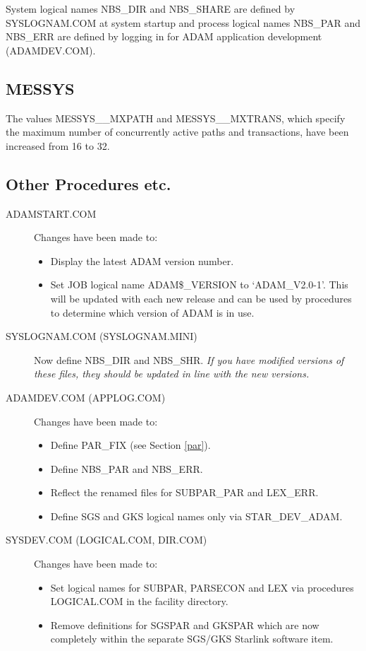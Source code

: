 System logical names NBS\_DIR and NBS\_SHARE are defined by SYSLOGNAM.COM at
system startup and process logical names NBS\_PAR and NBS\_ERR are defined by
logging in for ADAM application development (ADAMDEV.COM).

\subsection{MESSYS}
The values MESSYS\_\_MXPATH and MESSYS\_\_MXTRANS, which specify the maximum
number of concurrently active paths and transactions, have been increased from
16 to 32.

\subsection{Other Procedures etc.}
\begin{description}

\item[ADAMSTART.COM] Changes have been made to:
\begin{itemize}
\item Display the latest ADAM version number.
\item Set JOB logical name ADAM\$\_VERSION to `ADAM\_V2.0-1'.
This will be updated with each new release and can be used by procedures
to determine which version of ADAM is in use.
\end{itemize}
\item[SYSLOGNAM.COM (SYSLOGNAM.MINI)] Now define NBS\_DIR 
and NBS\_SHR. 
{\em If you have modified versions of these files, they should be
updated in line with the new versions.}
\item[ADAMDEV.COM (APPLOG.COM)] Changes have been made to:
\begin{itemize}
\item Define PAR\_FIX (see Section \ref{par}).
\item Define  NBS\_PAR and NBS\_ERR.
\item Reflect the renamed files for SUBPAR\_PAR and LEX\_ERR.
\item Define SGS and GKS logical names only via STAR\_DEV\_ADAM.
\end{itemize}

\item[SYSDEV.COM (LOGICAL.COM, DIR.COM)] Changes have been made to:
\begin{itemize} 
\item Set logical names for SUBPAR, PARSECON and  LEX via procedures
LOGICAL\-.COM in the facility directory.
\item Remove definitions for SGSPAR and GKSPAR which are now completely within
the separate SGS/GKS Starlink software item.
\end{itemize}


\end{description}
